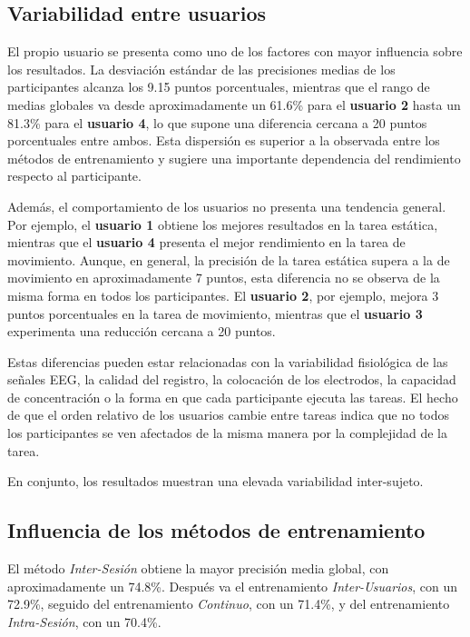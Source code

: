 \subsection{Variabilidad entre usuarios}

El propio usuario se presenta como uno de los factores con mayor influencia sobre los resultados. La desviación estándar de las precisiones medias de los participantes alcanza los 9.15 puntos porcentuales, mientras que el rango de medias globales va desde aproximadamente un 61.6\% para el \textbf{usuario 2} hasta un 81.3\% para el \textbf{usuario 4}, lo que supone una diferencia cercana a 20 puntos porcentuales entre ambos. Esta dispersión es superior a la observada entre los métodos de entrenamiento y sugiere una importante dependencia del rendimiento respecto al participante.

Además, el comportamiento de los usuarios no presenta una tendencia general. Por ejemplo, el \textbf{usuario 1} obtiene los mejores resultados en la tarea estática, mientras que el \textbf{usuario 4} presenta el mejor rendimiento en la tarea de movimiento. Aunque, en general, la precisión de la tarea estática supera a la de movimiento en aproximadamente 7 puntos, esta diferencia no se observa de la misma forma en todos los participantes. El \textbf{usuario 2}, por ejemplo, mejora 3 puntos porcentuales en la tarea de movimiento, mientras que el \textbf{usuario 3} experimenta una reducción cercana a 20 puntos.

Estas diferencias pueden estar relacionadas con la variabilidad fisiológica de las señales EEG, la calidad del registro, la colocación de los electrodos, la capacidad de concentración o la forma en que cada participante ejecuta las tareas. El hecho de que el orden relativo de los usuarios cambie entre tareas indica que no todos los participantes se ven afectados de la misma manera por la complejidad de la tarea.

En conjunto, los resultados muestran una elevada variabilidad inter-sujeto.


\subsection{Influencia de los métodos de entrenamiento}

El método \textit{Inter-Sesión} obtiene la mayor precisión media global, con aproximadamente un 74.8\%. Después va el entrenamiento \textit{Inter-Usuarios}, con un 72.9\%, seguido del entrenamiento \textit{Continuo}, con un 71.4\%, y del entrenamiento \textit{Intra-Sesión}, con un 70.4\%.

